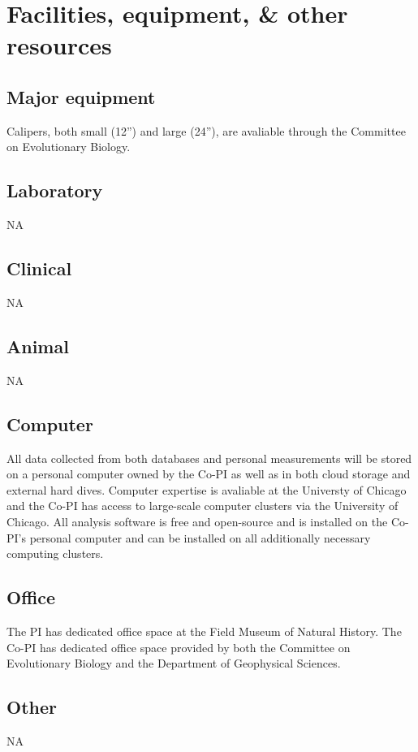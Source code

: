 \documentclass[11pt,letterpaper]{article}
\begin{document}
\setcounter{secnumdepth}{0}
\section{Facilities, equipment, \& other resources}

\subsection{Major equipment}
Calipers, both small (12'') and large (24''), are avaliable through the Committee on Evolutionary Biology.

\subsection{Laboratory}
NA

\subsection{Clinical}
NA

\subsection{Animal}
NA

\subsection{Computer}
All data collected from both databases and personal measurements will be stored on a personal computer owned by the Co-PI as well as in both cloud storage and external hard dives. Computer expertise is avaliable at the Universty of Chicago and the Co-PI has access to large-scale computer clusters via the University of Chicago. All analysis software is free and open-source and is installed on the Co-PI's personal computer and can be installed on all additionally necessary computing clusters.

\subsection{Office}
The PI has dedicated office space at the Field Museum of Natural History. The Co-PI has dedicated office space provided by both the Committee on Evolutionary Biology and the Department of Geophysical Sciences.

\subsection{Other}
NA
\end{document}
